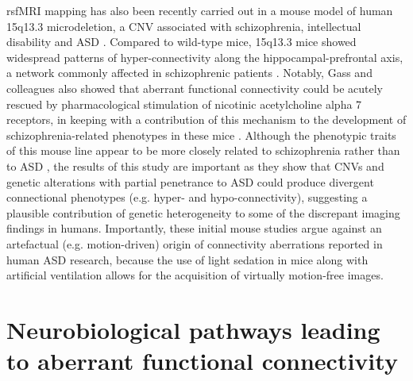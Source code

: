 rsfMRI mapping has also been recently carried out in a mouse model of human
15q13.3 microdeletion, a CNV associated with schizophrenia, intellectual
disability and ASD \parencite{shinawi2009}. Compared to wild-type mice, 15q13.3
mice showed widespread patterns of hyper-connectivity along the
hippocampal-prefrontal axis, a network commonly affected in schizophrenic
patients \parencite{gass2016}. Notably, Gass and colleagues also showed that
aberrant functional connectivity could be acutely rescued by pharmacological
stimulation of nicotinic acetylcholine alpha 7 receptors, in keeping with a
contribution of this mechanism to the development of schizophrenia-related
phenotypes in these mice \parencite{gass2016}. Although the phenotypic traits of
this mouse line appear to be more closely related to schizophrenia rather than
to ASD \parencite{fejgin2014}, the results of this study are important as they
show that CNVs and genetic alterations with partial penetrance to ASD could
produce divergent connectional phenotypes (e.g. hyper- and hypo-connectivity),
suggesting a plausible contribution of genetic heterogeneity to some of the
discrepant imaging findings in humans. Importantly, these initial mouse studies
argue against an artefactual (e.g. motion-driven) origin of connectivity
aberrations reported in human ASD research, because the use of light sedation in
mice along with artificial ventilation allows for the acquisition of virtually
motion-free images.

\section{Neurobiological pathways leading to aberrant functional connectivity}

